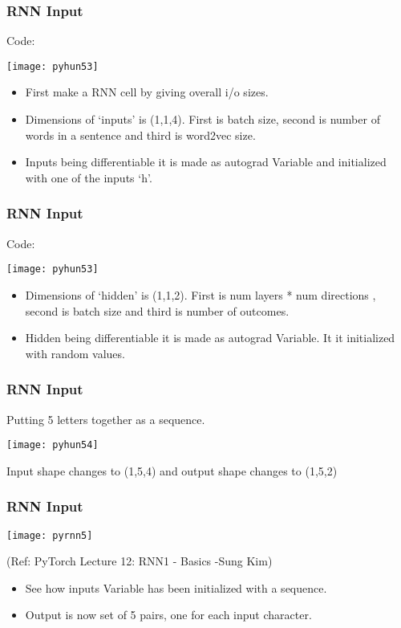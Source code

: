 \begin{frame}[fragile] \frametitle{RNN Input}
Code:
\begin{center}
\texttt{[image: pyhun53]}
\end{center}

\begin{itemize}
\item First make a RNN cell by giving overall i/o sizes.
\item Dimensions of `inputs' is (1,1,4). First is batch size, second is number of words in a sentence and third is word2vec size.
\item Inputs being differentiable it is made as autograd Variable and initialized with one of the inputs `h'.
\end{itemize}
\end{frame}

\begin{frame}[fragile] \frametitle{RNN Input}
Code:
\begin{center}
\texttt{[image: pyhun53]}
\end{center}

\begin{itemize}
\item Dimensions of `hidden' is (1,1,2). First is num layers * num directions , second is batch size and third is number of outcomes.
\item Hidden being differentiable it is made as autograd Variable. It it initialized with random values.
\end{itemize}
\end{frame}

\begin{frame}[fragile] \frametitle{RNN Input}

Putting 5 letters together as a sequence.

\begin{center}
\texttt{[image: pyhun54]}
\end{center}

Input shape changes to (1,5,4) and output shape changes to (1,5,2)
\end{frame}

\begin{frame}[fragile] \frametitle{RNN Input}

\begin{center}
\texttt{[image: pyrnn5]}

\tiny{(Ref: PyTorch Lecture 12: RNN1 - Basics -Sung Kim)}
\end{center}
\begin{itemize}
\item See how inputs Variable has been initialized with a sequence.
\item Output is now set of 5 pairs, one for each input character.
\end{itemize}
\end{frame}


